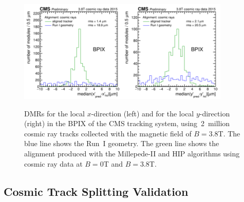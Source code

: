 \begin{figure}[htb]
    \begin{center}
        \includegraphics[width=0.45\textwidth]{../figs/Alignment/AlRes_CRAFT_DmedianR_BPIX_plain.png}\includegraphics[width=0.45\textwidth]{../figs/Alignment/AlRes_CRAFT_DmedianYR_BPIX_plain.png}
    \end{center}
    \caption {DMRs for the local $x$-direction (left) and for the local $y$-direction (right) in the BPIX of the CMS tracking system, using~2~million cosmic ray tracks collected with the magnetic field of $B=3.8$T. The blue line shows the Run~I geometry. The green line shows the alignment produced with the Millepede-II and HIP algorithms using cosmic ray data at $B=0$T and $B=3.8$T.}
    \label{fig:DMRs}
\end{figure}

\subsection{Cosmic Track Splitting Validation}
\label{sec:AlRes_trackSplit}

